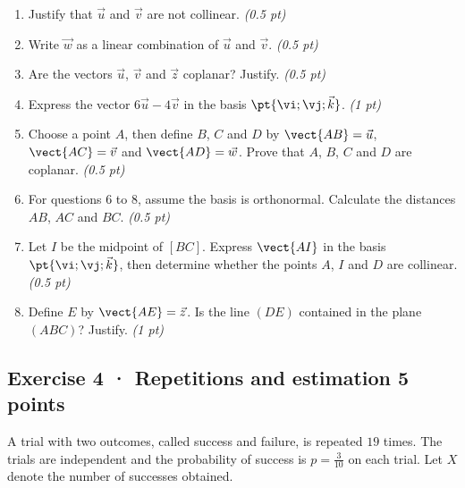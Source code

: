 \begin{enumerate}

\item Justify that $\vec u$ and $\vec v$ are not collinear. \hfill\textit{(0.5 pt)}

\item Write $\vec w$ as a linear combination of $\vec u$ and $\vec v$. \hfill\textit{(0.5 pt)}

\item Are the vectors $\vec u$, $\vec v$ and $\vec z$ coplanar? Justify. \hfill\textit{(0.5 pt)}

\item Express the vector $6\vec u-4\vec v$ in the basis $\pt{\vi;\vj;\vec k}$. \hfill\textit{(1 pt)}

\item Choose a point $A$, then define $B$, $C$ and $D$ by $\vect{AB}=\vec u$, $\vect{AC}=\vec v$ and $\vect{AD}=\vec w$. Prove that $A$, $B$, $C$ and $D$ are coplanar. \hfill\textit{(0.5 pt)}

\item For questions 6 to 8, assume the basis is orthonormal. Calculate the distances $AB$, $AC$ and $BC$. \hfill\textit{(0.5 pt)}

\item Let $I$ be the midpoint of $[BC]$. Express $\vect{AI}$ in the basis $\pt{\vi;\vj;\vec k}$, then determine whether the points $A$, $I$ and $D$ are collinear. \hfill\textit{(0.5 pt)}

\item Define $E$ by $\vect{AE}=\vec z$. Is the line $(DE)$ contained in the plane $(ABC)$? Justify. \hfill\textit{(1 pt)}

\end{enumerate}

\subsection*{Exercise 4 · Repetitions and estimation \hfill 5 points}A trial with two outcomes, called success and failure, is repeated $19$ times. The trials are independent and the probability of success is $p=\frac{3}{10}$ on each trial. Let $X$ denote the number of successes obtained.

